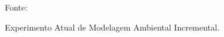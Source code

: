 \documentclass[xcolor=dvipsnames, aspectratio=169]{beamer}
\begin{document}
\begin{frame}
\begin{itemize}
      \begin{figure}
        \centering
        {Fonte: \cite{buniyamin2011simple}}
        \caption{Experimento Atual de Modelagem Ambiental Incremental.}
        \label{fig:9}
      \end{figure}

  \end{itemize}
  \end{frame}

\begin{frame}
    \printbibliography
\end{frame}


\begin{frame}
\titlepage %
\end{frame}
\end{document}
